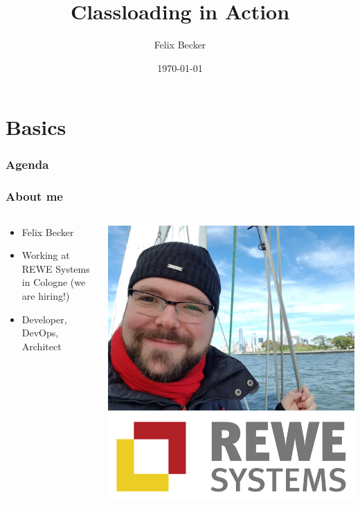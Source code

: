 \documentclass[aspectratio=169]{beamer}
\title{Classloading in Action}
\author{Felix Becker}
\date{\today}
\institute{JAX 2019}
\begin{document}
\maketitle


\section{Basics}

\begin{frame}
	\frametitle{Agenda}
	\tableofcontents
\end{frame}

\begin{frame}
	\frametitle{About me}

\begin{columns}
    \begin{column}{0.68\textwidth}
		\begin{itemize}
		\item{Felix Becker}
		\item{Working at REWE Systems in Cologne (we are hiring!)}
		\item{Developer, DevOps, Architect}
		\end{itemize}
    \end{column}
    \begin{column}{0.28\textwidth}
		\includegraphics[scale=0.03]{assets/profilfoto-freizeit.jpg}
\\
\bigskip
		\includegraphics[scale=0.15]{assets/rewesyslogo.jpg}
    \end{column}
\end{columns}
\end{frame}
\end{document}
